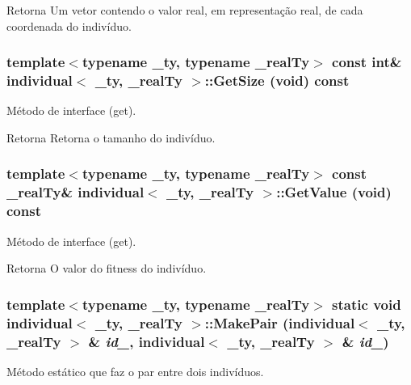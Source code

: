 \begin{DoxyReturn}{Retorna}
Um vetor contendo o valor real, em representação real, de cada coordenada do indivíduo. 
\end{DoxyReturn}
\hypertarget{classindividual_a061ed50343d97420486e74d49e38a96f}{
\subsubsection[{GetSize}]{\setlength{\rightskip}{0pt plus 5cm}template$<$typename \_\-ty, typename \_\-realTy$>$ const int\& {\bf individual}$<$ \_\-ty, \_\-realTy $>$::GetSize (void) const}}
\label{classindividual_a061ed50343d97420486e74d49e38a96f}
Método de interface (get).

\begin{DoxyReturn}{Retorna}
Retorna o tamanho do indivíduo. 
\end{DoxyReturn}
\hypertarget{classindividual_adf23ea4763b162d8e84ee53765775697}{
\subsubsection[{GetValue}]{\setlength{\rightskip}{0pt plus 5cm}template$<$typename \_\-ty, typename \_\-realTy$>$ const \_\-realTy\& {\bf individual}$<$ \_\-ty, \_\-realTy $>$::GetValue (void) const}}
\label{classindividual_adf23ea4763b162d8e84ee53765775697}
Método de interface (get).

\begin{DoxyReturn}{Retorna}
O valor do fitness do indivíduo. 
\end{DoxyReturn}
\hypertarget{classindividual_a848c15d022ac9f2b446b45d7fae7ddd0}{
\subsubsection[{MakePair}]{\setlength{\rightskip}{0pt plus 5cm}template$<$typename \_\-ty, typename \_\-realTy$>$ static void {\bf individual}$<$ \_\-ty, \_\-realTy $>$::MakePair ({\bf individual}$<$ \_\-ty, \_\-realTy $>$ \& {\em id\_}, \/  {\bf individual}$<$ \_\-ty, \_\-realTy $>$ \& {\em id\_})}}
\label{classindividual_a848c15d022ac9f2b446b45d7fae7ddd0}
Método estático que faz o par entre dois indivíduos.

